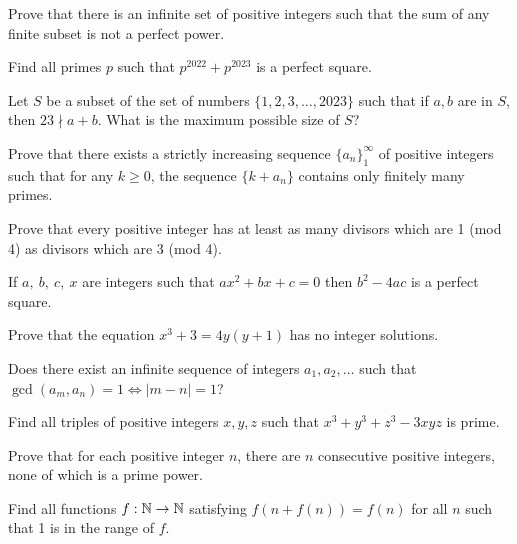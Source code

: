 \begin{problem}{\label{p:i:n:pr:45}}
  Prove that there is an infinite set of positive integers such that the
    sum of any finite subset is not a perfect power.
\end{problem}
\begin{problem}{\label{p:i:n:pr:46}}
    Find all primes $p$ such that $p^{2022}+p^{2023}$ is a perfect square.
\end{problem}
\begin{problem}{\label{p:i:n:pr:47}}
    Let $S$ be a subset of the set of numbers $\{1, 2, 3,\ldots, 2023\}$
    such that if $a,b$ are in $S$, then $23\nmid a+b$. What is the maximum
    possible size of $S$?
\end{problem}
\begin{problem}{\label{p:i:n:pr:48}}
  Prove that there exists a strictly increasing sequence $\{a_n\}_1^\infty$
    of positive integers such that for any $k\ge 0$, the sequence $\{k+a_n\}$
    contains only finitely many primes.
\end{problem}
\begin{problem}{\label{p:i:n:pr:49}}
    Prove that every positive integer has at least as many divisors which
    are 1 (mod 4) as divisors which are 3 (mod 4).
\end{problem}
\begin{result}{\label{r:i:n:pr:3}}
    If $a,\ b,\ c,\ x$ are integers such that $ax^2+bx+c=0$ then $b^2-4ac$ is a
    perfect square.
\end{result}
\begin{problem}{\label{p:i:n:pr:50}}
  Prove that the equation $x^3+3=4y(y+1)$ has no integer solutions.
\end{problem}
\begin{problem}{\label{p:i:n:pr:51}}
  Does there exist an infinite sequence of integers $a_1,a_2,\ldots$ such
    that $\gcd(a_m,a_n)=1\iff |m-n|=1$?
\end{problem}
\begin{problem}{\label{p:i:n:pr:52}}
  Find all triples of positive integers $x, y, z$ such that
      $x^3+y^3+z^3-3xyz$ is prime.
\end{problem}
\begin{problem}{\label{p:i:n:pr:53}}
  Prove that for each positive integer $n$, there are $n$ consecutive
    positive integers, none of which is a prime power.
\end{problem}
\begin{problem}{\label{p:i:n:pr:54}}
  Find all functions $f:\mathbb{N}\to\mathbb{N}$ satisfying $f(n+f(n))=f(n)$ for all
    $n$ such that 1 is in the range of $f$.
\end{problem}
